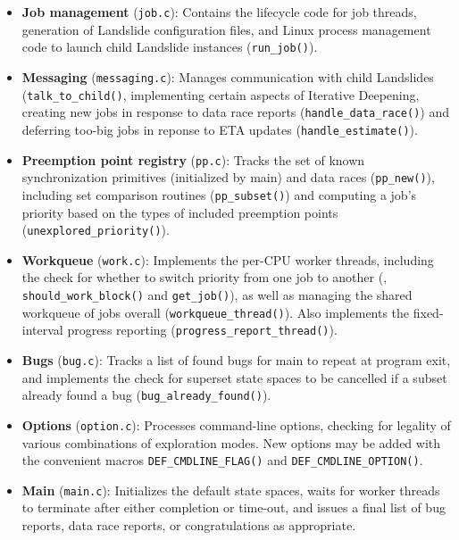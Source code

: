 \begin{itemize}
	\item {\bf Job management} ({\tt job.c}):
		Contains the lifecycle code for job threads,
		generation of Landslide configuration files,
		and Linux process management code to launch child Landslide instances ({\tt run\_job()}).
	\item {\bf Messaging} ({\tt messaging.c}):
		Manages communication with child Landslides ({\tt talk\_\allowbreak{}to\_child()},
		implementing certain aspects of Iterative Deepening,
		creating new jobs in response to data race reports ({\tt handle\_data\_race()})
		and deferring too-big jobs in reponse to ETA updates  ({\tt handle\_estimate()}).
	\item {\bf Preemption point registry} ({\tt pp.c}):
		Tracks the set of known synchronization primitives (initialized by main)
		and data races ({\tt pp\_new()}),
		including set comparison routines ({\tt pp\_subset()})
		and computing a job's priority based on the types of included preemption points ({\tt unexplored\_priority()}).
	\item {\bf Workqueue} ({\tt work.c}):
		Implements the per-CPU worker threads,
		including the check for whether to switch priority from one job to another
		(, {\tt should\_work\_\allowbreak{}block()} and {\tt get\_job()}),
		as well as managing the shared workqueue of jobs overall ({\tt workqueue\_thread()}).
		Also implements the fixed-interval progress reporting ({\tt progress\_report\_thread()}).
	\item {\bf Bugs} ({\tt bug.c}):
		Tracks a list of found bugs for main to repeat at program exit,
		and implements the check for superset state spaces to be cancelled if a subset already found a bug
		({\tt bug\_already\_found()}).
	\item {\bf Options} ({\tt option.c}):
		Processes command-line options,
		checking for legality of various combinations of exploration modes.
		New options may be added with the convenient
		macros {\tt DEF\_CMDLINE\_FLAG()} and {\tt DEF\_CMDLINE\_OPTION()}.
	\item {\bf Main} ({\tt main.c}):
		Initializes the default state spaces,
		waits for worker threads to terminate after either completion or time-out,
		and issues a final list of bug reports, data race reports, or congratulations as appropriate.
\end{itemize}

